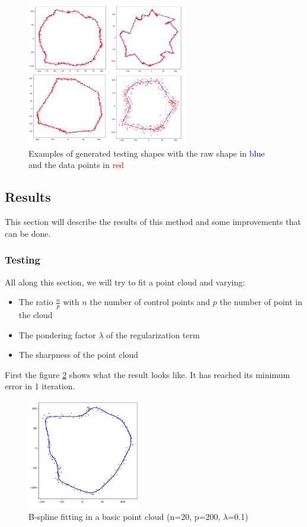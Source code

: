 \documentclass{article}
\begin{document}
\begin{figure}[H]
    \centering
    \includegraphics[width=7cm]{images/shape_gen_examples.png}
    \caption[Examples of generated testing shapes]{Examples of generated testing shapes with the raw shape in \textcolor{blue}{blue} and the data points in \textcolor{red}{red}}
    \label{fig:shape_gen_examples}
\end{figure}


\subsection{Results}

This section will describe the results of this method and some improvements that can be done.

\subsubsection{Testing}

All along this section, we will try to fit a point cloud and varying:

\begin{itemize}
    \item The ratio $\frac{n}{p}$ with $n$ the number of control points and $p$ the number of point in the cloud
    \item The pondering factor $\lambda$ of the regularization term
    \item The sharpness of the point cloud
\end{itemize}

First the figure \ref{fig:bsp_res_general} shows what the result looks like. It has reached its minimum error in 1 iteration. 

\begin{figure}[H]
    \centering
    \includegraphics[width=5cm]{images/bsp_res_general.png}
    \caption[B-spline fitting in a basic point cloud]{B-spline fitting in a basic point cloud (n=20, p=200, $\lambda$=0.1)}
    \label{fig:bsp_res_general}
\end{figure}
\end{document}
